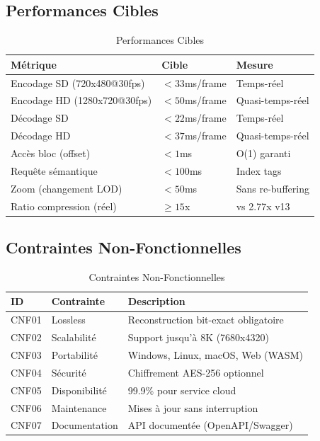 \documentclass[12pt,a4paper]{article}
\begin{document}
	\subsection{Performances Cibles}
	\label{subsec:performances}
	
	\begin{table}[h]
		\centering
		\caption{Performances Cibles}
		\label{tab:performances}
		\begin{tabular}{@{}lll@{}}
			\toprule
			\textbf{Métrique} & \textbf{Cible} & \textbf{Mesure} \\
			\midrule
			Encodage SD (720x480@30fps) & $< 33$ms/frame & Temps-réel \\
			Encodage HD (1280x720@30fps) & $< 50$ms/frame & Quasi-temps-réel \\
			Décodage SD & $< 22$ms/frame & Temps-réel \\
			Décodage HD & $< 37$ms/frame & Quasi-temps-réel \\
			Accès bloc (offset) & $< 1$ms & O(1) garanti \\
			Requête sémantique & $< 100$ms & Index tags \\
			Zoom (changement LOD) & $< 50$ms & Sans re-buffering \\
			Ratio compression (réel) & $\geq 15$x & vs 2.77x v13 \\
			\bottomrule
		\end{tabular}
	\end{table}
	
	\subsection{Contraintes Non-Fonctionnelles}
	\label{subsec:contraintes}
	
	\begin{table}[h]
		\centering
		\caption{Contraintes Non-Fonctionnelles}
		\label{tab:contraintes}
		\begin{tabular}{@{}llp{8cm}@{}}
			\toprule
			\textbf{ID} & \textbf{Contrainte} & \textbf{Description} \\
			\midrule
			CNF01 & Lossless & Reconstruction bit-exact obligatoire \\
			CNF02 & Scalabilité & Support jusqu'à 8K (7680x4320) \\
			CNF03 & Portabilité & Windows, Linux, macOS, Web (WASM) \\
			CNF04 & Sécurité & Chiffrement AES-256 optionnel \\
			CNF05 & Disponibilité & 99.9\% pour service cloud \\
			CNF06 & Maintenance & Mises à jour sans interruption \\
			CNF07 & Documentation & API documentée (OpenAPI/Swagger) \\
			\bottomrule
		\end{tabular}
	\end{table}
	
\end{document}
